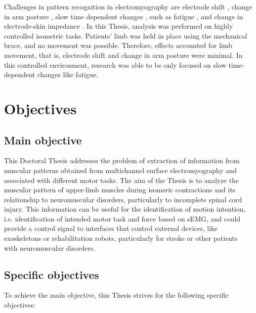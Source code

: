 Challenges in pattern recognition in electromyography are electrode shift \citep{Hargrove2008, Young2011}, change in arm posture \citep{Fougner2011}, slow time dependent changes \citep{Farina2014}, such as fatigue \citep{Tkach2010}, and change in electrode-skin impedance \citep{Clancy2002b}. In this Thesis, analysis was performed on highly controlled isometric tasks. Patients' limb was held in place using the mechanical brace, and no movement was possible. Therefore, effects accounted for limb movement, that is, electrode shift and change in arm posture were minimal. In this controlled environment, research was able to be only focused on slow time-dependent changes like fatigue. 


     \section{Objectives}
     
     	\subsection*{Main objective}

This Doctoral Thesis addresses the problem of extraction of information from muscular patterns obtained from multichannel surface electromyography and associated with different motor tasks. The aim of the Thesis is to analyze the muscular pattern of upper-limb muscles during isomeric contractions and its relationship to neuromuscular disorders, particularly to incomplete spinal cord injury. This information can be useful for the identification of motion intention, i.e. identification of intended motor task and force based on sEMG, and could provide a control signal to interfaces that control external devices, like exoskeletons or rehabilitation robots, particularly for stroke or other patients with neuromuscular disorders.




        
        \subsection*{Specific objectives}
        
To achieve the main objective, this Thesis strives for the following specific objectives:

